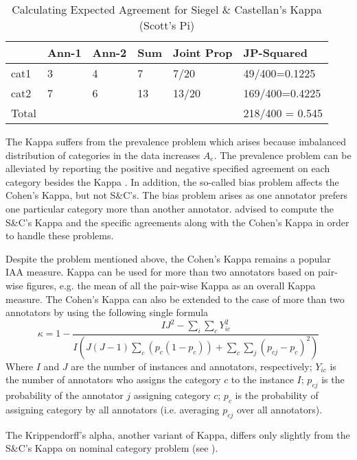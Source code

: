 \begin{table}[hbt]
{\centering
\begin{tabular}{|l|l|l|l|l|l|} 
\hline
   & Ann-1 & Ann-2 & Sum & Joint Prop &
   JP-Squared \\
\hline
cat1 & 3 & 4 & 7 & 7/20 & 49/400=0.1225 \\ 
cat2 & 7 & 6 & 13 & 13/20 & 169/400=0.4225 \\ 
\hline
Total & & & & & 218/400 = 0.545 \\
\hline
\end{tabular}\par}
\caption{Calculating Expected Agreement for Siegel \& Castellan's Kappa
(Scott's Pi)}
\label{table:iaa-kappa:scotts}
\end{table}

The Kappa suffers from the prevalence problem which arises because imbalanced
distribution of categories in the data increases $A_{e}$. The prevalence problem
can be alleviated by reporting the positive and negative specified  agreement on
each category besides the Kappa \cite{ Hripcsak02, Eugenio04}. In addition, the
so-called bias problem affects the Cohen's Kappa, but not S\&C's. The bias
problem arises as one annotator prefers one particular category more than another
annotator. \cite{Eugenio04} advised to compute the S\&C's Kappa and the specific
agreements along with the Cohen's Kappa in order to handle these problems.

Despite the problem mentioned above, the Cohen's Kappa remains a popular IAA measure. 
Kappa can be used for more than two annotators based on pair-wise figures, e.g. the mean
of all the pair-wise Kappa as an overall Kappa measure. The Cohen's Kappa can also be
extended to the case of more than two annotators by using the following single 
formula  \cite{Davies82}
\begin{equation}
\kappa = 1-\frac{IJ^{2}-\sum_{i}\sum_{c}Y_{ic}^{2}}
{I(J(J-1)\sum_{c}(p_{c}(1-p_{c}))+ \sum_{c}\sum_{j}(p_{cj}-p_{c})^2)}
\end{equation}
Where $I$ and $J$ are the number of instances and annotators, respectively; $Y_{ic}$ 
is the number of annotators who assigns the category $c$ to the instance $I$; $p_{cj}$ 
is the probability of the annotator $j$ assigning category $c$; $p_{c}$ is the 
probability of assigning category by all annotators (i.e. averaging $p_{cj}$  
over all annotators).

The Krippendorff's alpha, another variant of Kappa, differs only slightly from
the S\&C's Kappa on nominal category problem (see \cite{Carletta96, Eugenio04}).

